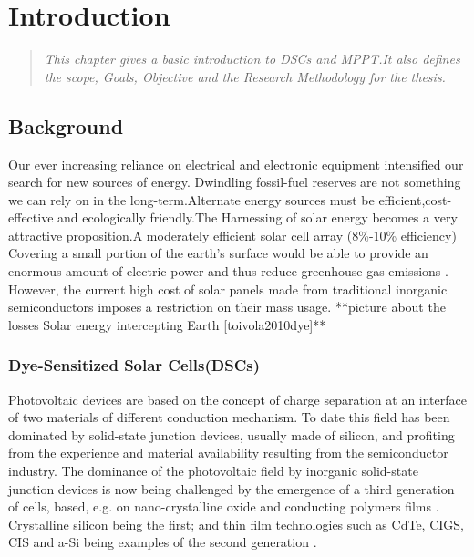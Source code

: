 \chapter{Introduction}
\begin{quote} 
\it This chapter gives a basic introduction to  \ac{DSCs} and \ac{MPPT}.It also defines the scope, Goals, Objective and the Research Methodology for the thesis.
\end{quote}

\section{Background}

Our ever increasing reliance on electrical and electronic equipment intensified our search for new sources of energy. Dwindling fossil-fuel reserves are not something we can rely on in the long-term.Alternate energy sources must be efficient,cost-effective and ecologically friendly.The Harnessing of solar energy becomes a very attractive proposition.A moderately efficient solar cell array (8\%-10\% efficiency) Covering a small portion of the earth's surface would be able to provide an enormous amount of electric power and thus reduce greenhouse-gas emissions \cite{kalyanasundaram2010dye}. However, the current high cost of solar panels made from traditional inorganic semiconductors imposes a restriction on their mass usage.
 **picture about the losses  Solar energy intercepting Earth [toivola2010dye]**
 
 \subsection{Dye-Sensitized Solar Cells(DSCs)}
  Photovoltaic devices are based on the concept of charge separation at an interface of two materials of different conduction mechanism. To date this field has been dominated by solid-state junction devices, usually made of silicon, and profiting from the experience and material availability resulting from the semiconductor industry. The dominance of the photovoltaic field by inorganic solid-state junction devices is now being challenged by the emergence of a third generation of cells, based, e.g. on nano-crystalline oxide and conducting polymers films \cite{gratzel2004conversion}. Crystalline silicon being the first; and thin film technologies such as \ac{CdTe}, \ac{CIGS}, \ac{CIS} and \ac{a-Si} being examples of the second generation \cite{toivola2010dye}.\\
  
